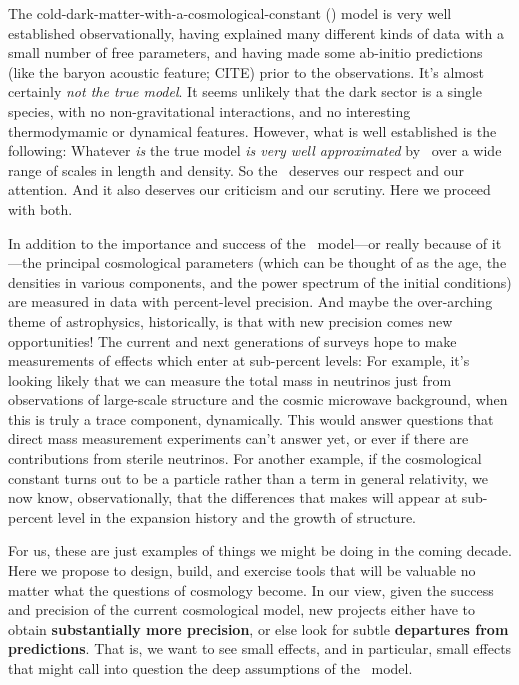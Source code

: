 \documentclass[12pt, fullpage, letterpaper]{article}
\begin{document}
The cold-dark-matter-with-a-cosmological-constant (\LCDM) model is
very well established observationally, having explained many different
kinds of data with a small number of free parameters, and having made
some ab-initio predictions (like the baryon acoustic feature; CITE)
prior to the observations.
It's almost certainly \emph{not the true model}.
It seems unlikely that the dark sector is a single species, with no
non-gravitational interactions, and no interesting thermodymamic or
dynamical features.
However, what is well established is the following:
Whatever \emph{is} the true model \emph{is very well approximated} by
\LCDM\ over a wide range of scales in length and density.
So the \LCDM\ deserves our respect and our attention.
And it also deserves our criticism and our scrutiny.
Here we proceed with both.

In addition to the importance and success of the \LCDM\ model---or
really because of it---the principal cosmological parameters (which
can be thought of as the age, the densities in various components, and
the power spectrum of the initial conditions) are measured in data
with percent-level precision.
And maybe the over-arching theme of astrophysics, historically, is
that with new precision comes new opportunities!
The current and next generations of surveys hope to
make measurements of effects which enter at sub-percent levels:
For example, it's looking likely that we can measure the total mass in
neutrinos just from observations of large-scale structure and the
cosmic microwave background, when this is truly a trace component,
dynamically.
This would answer questions that direct mass measurement experiments
can't answer yet, or ever if there are contributions from sterile
neutrinos.
For another example, if the cosmological constant turns out to be a particle rather
than a term in general relativity, we now know, observationally, that
the differences that makes will appear at sub-percent level in the
expansion history and the growth of structure.

For us, these are just examples of things we might be doing in the
coming decade.
Here we propose to design, build, and exercise tools that will be
valuable no matter what the questions of cosmology become.
In our view, given the success and precision of the current
cosmological model, new projects either have to obtain
\textbf{substantially more precision}, or else look for subtle
\textbf{departures from predictions}.
That is, we want to see small effects, and in particular, small
effects that might call into question the deep assumptions of the
\LCDM\ model.
\end{document}
